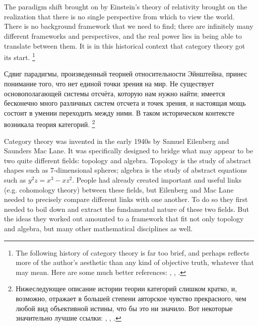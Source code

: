 \documentclass[CT4S-EN-RU]{subfiles}
\begin{document}
\section{}

\begin{blockENG}
The paradigm shift brought on by Einstein's theory of relativity brought on the realization that there is no single perspective from which to view the world. There is no background framework that we need to find; there are infinitely many different frameworks and perspectives, and the real power lies in being able to translate between them. It is in this historical context that category theory got its start.%
\footnote{The following history of category theory is far too brief, and perhaps reflects more of the author's aesthetic than any kind of objective truth, whatever that may mean. Here are some much better references: \cite{Kro}, \cite{Mar1}, \cite{LM}.}
\end{blockENG}


\begin{blockRUS}
Сдвиг парадигмы, произведенный теорией относительности Эйнштейна, принес понимание того, что нет единой точки зрения на мир. Не существует основополагающей системы отсчёта, которую нам нужно найти; имеется бесконечно много различных систем отсчета и точек зрения, и настоящая мощь состоит в умении переходить между ними. В таком историческом контексте возникала теория категорий.%
\footnote{Нижеследующее описание истории теории категорий слишком кратко, и, возможно, отражает в большей степени авторское чувство прекрасного, чем любой вид объективной истины, что бы это ни значило. Вот некоторые значительно лучшие ссылки: \cite{Kro}, \cite{Mar1}, \cite{LM}.}%
\end{blockRUS}

\begin{blockENG}
Category theory was invented in the early 1940s by Samuel Eilenberg and Saunders Mac Lane. It was specifically designed to bridge what may appear to be two quite different fields: topology and algebra. Topology is the study of abstract shapes such as 7-dimensional spheres; algebra is the study of abstract equations such as $y^2z=x^3-xz^2$. People had already created important and useful links (e.g. cohomology theory) between these fields, but Eilenberg and Mac Lane needed to precisely compare different links with one another. To do so they first needed to boil down and extract the fundamental nature of these two fields. But the ideas they worked out amounted to a framework that fit not only topology and algebra, but many other mathematical disciplines as well.
\end{blockENG}
\end{document}
